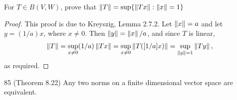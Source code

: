 \begin{exercise}{82}
For $T\in B(V,W)$, prove that $\left\lVert T\right\rVert = \sup\{\left\lVert Tx\right\rVert: \left\lVert x\right\rVert=1\}$
\end{exercise}
\begin{proof}
This proof is due to Kreyszig, Lemma 2.7.2.
Let $\left\lVert x\right\rVert=a$ and let $y=(1/a)x$, where $x\neq 0$.
Then $\left\lVert y\right\rVert=\left\lVert x\right\rVert/a$, and since $T$ is linear, 
\begin{align*}
    \left\lVert T\right\rVert 
    = \sup_{x\neq 0}(1/a)\left\lVert Tx\right\rVert
    = \sup_{x\neq 0}\left\lVert T([1/a]x)\right\rVert
    = \sup_{\left\lVert y\right\rVert=1}\left\lVert Ty\right\rVert,
\end{align*}
as required.
\end{proof} 

\begin{exercise}{85 (Theorem 8.22)}
Any two norms on a finite dimensional vector space are equivalent.
\end{exercise}
